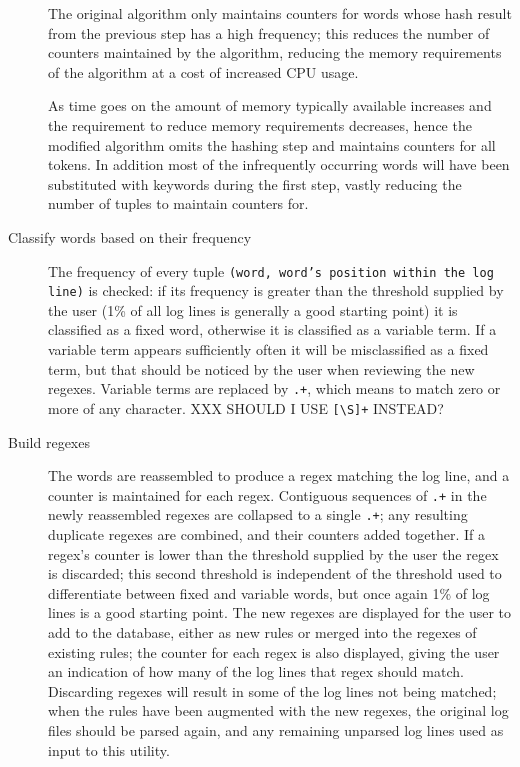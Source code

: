 \begin{description}
        The original algorithm only maintains counters for words whose hash
        result from the previous step has a high frequency; this reduces
        the number of counters maintained by the algorithm, reducing the
        memory requirements of the algorithm at a cost of increased CPU
        usage.
        
        As time goes on the amount of memory typically available increases
        and the requirement to reduce memory requirements decreases, hence
        the modified algorithm omits the hashing step and maintains
        counters for all tokens. In addition most of the infrequently
        occurring words will have been substituted with keywords during the
        first step, vastly reducing the number of tuples to maintain
        counters for.

    \item [Classify words based on their frequency]  The frequency of every
        tuple \texttt{(word, word's position within the log line)} is
        checked: if its frequency is greater than the threshold supplied by
        the user (1\% of all log lines is generally a good starting point)
        it is classified as a fixed word, otherwise it is classified as a
        variable term.  If a variable term appears sufficiently often it
        will be misclassified as a fixed term, but that should be noticed
        by the user when reviewing the new regexes.  Variable terms are
        replaced by \texttt{.+}, which means to match zero or more of any
        character.  XXX SHOULD I USE \verb![\S]+! INSTEAD\@?

    \item [Build regexes]  The words are reassembled to produce a regex
        matching the log line, and a counter is maintained for each
        regex.  Contiguous sequences of \texttt{.+} in the newly
        reassembled regexes are collapsed to a single \texttt{.+}; any
        resulting duplicate regexes are combined, and their counters
        added together.  If a regex's counter is lower than the
        threshold supplied by the user the regex is discarded; this
        second threshold is independent of the threshold used to
        differentiate between fixed and variable words, but once again 1\%
        of log lines is a good starting point.  The new regexes are
        displayed for the user to add to the database, either as new rules
        or merged into the regexes of existing rules; the counter for
        each regex is also displayed, giving the user an indication of
        how many of the log lines that regex should match.  Discarding
        regexes will result in some of the log lines not being matched;
        when the rules have been augmented with the new regexes, the
        original log files should be parsed again, and any remaining
        unparsed log lines used as input to this utility.

\end{description}

